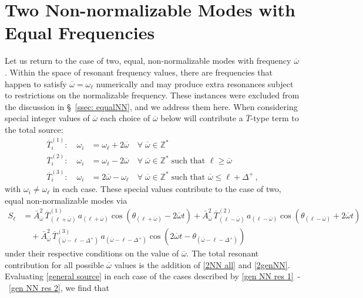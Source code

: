 \documentclass[letterpaper,11pt]{article}
\newcommand{\ol}{\omega_\ell}
\newcommand{\ob}{\overline{\omega}}
\begin{document}
\section{Two Non-normalizable Modes with Equal Frequencies}
\label{more 2NN}
Let us return to the case of two, equal, non-normalizable modes with frequency $\ob$. Within the space of resonant frequency values, there are frequencies that happen to satisfy $\ob = \ol$ numerically and may produce extra resonances subject to restrictions on the normalizable frequency. These instances were excluded from the discussion in \S\!~\ref{ssec: equalNN}, and we address them here. When considering special integer values of $\ob$ each choice of $\ob$ below will contribute a $\overline T$-type term to the total source:
\begin{align}
\label{gen NN res 1}
\overline{T}^{(1)}_{i}: \quad \omega_i &= \ol + 2\ob \quad \forall \; \ob \in \mathbb{Z}^* \\
\overline{T}^{(2)}_{i}: \quad \omega_i &= \ol - 2\ob \quad \forall \; \ob \in \mathbb{Z}^* \; \text{such that } \ell \geq \ob \\
\label{gen NN res 2}
\overline{T}^{(3)}_{i}: \quad \omega_i &= 2\ob - \ol \quad \forall \; \ob \in \mathbb{Z}^* \; \text{such that } \ob \leq \ell + \Delta^+ \, ,
\end{align}
with $\omega_i \neq \omega_\ell$ in each case. These special values contribute to the case of two, equal non-normalizable modes via
\begin{align}
\label{2NN all}
S_\ell &= \bar A^2_{\ob} \, \overline{T}^{(1)}_{(\ell + \ob)} \, a_{(\ell + \ob)} \cos \left( \theta_{(\ell + \ob)} - 2\ob t \right) + \bar A^2_{\ob} \, \overline{T}^{(2)}_{(\ell - \ob)} \, a_{(\ell - \ob)}\cos \left( \theta_{(\ell - \ob)} + 2\ob t \right) \nonumber \\
& \quad + \bar A^2_{\ob} \, \overline{T}^{(3)}_{(\ob - \ell - \Delta^+)} \, a_{(\ob - \ell- \Delta^+)} \cos \left( 2\ob t - \theta_{(\ob - \ell - \Delta^+)} \right) 
\end{align}
under their respective conditions on the value of $\ob$. The total resonant contribution for all possible $\ob$ values is the addition of \eqref{2NN all} and \eqref{2genNN}. 
Evaluating \eqref{general source} in each case of the cases described by \eqref{gen NN res 1}~\!-~\!\eqref{gen NN res 2}, we find that
\end{document}
